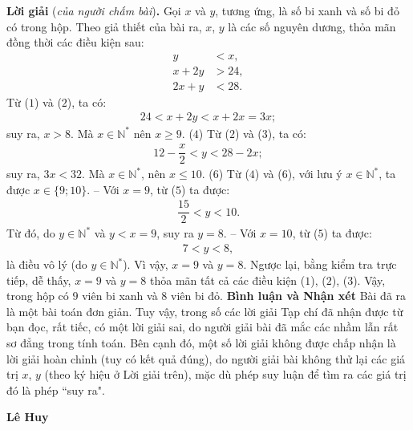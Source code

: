 \begin{multicols}{2}
	\vskip 0.05cm
	\textbf{\color{thachthuctoanhoc}Lời giải} (\textit{của người chấm bài})\textbf{\color{thachthuctoanhoc}.}
	\vskip 0.05cm
	Gọi $x$ và $y$, tương ứng, là số bi xanh và số bi đỏ có trong hộp.
	\vskip 0.05cm
	Theo giả thiết của bài ra, $x$, $y$ là các số nguyên dương, thỏa mãn đồng thời các điều kiện sau:
	\begin{align*}
		y &< x, \tag{$1$}\\
		x + 2y &> 24, \tag{$2$}\\
		2x + y &< 28. \tag{$3$}  
	\end{align*}
	Từ ($1$) và ($2$), ta có:
	\begin{align*}
		24 < x + 2y < x + 2x = 3x;
	\end{align*}
	suy ra, $x > 8$. Mà $x \in \mathbb{N^*}$  nên $x \ge  9$. \hfill ($4$)
	\vskip 0.05cm
	Từ ($2$) và ($3$), ta có:
	\begin{align*}
		12 - \dfrac{x}{2} < y < 28-2x; \tag{$5$}
	\end{align*}
	suy ra, $3x < 32$. Mà $x \in \mathbb{N^*}$, nên $x \le 10$. \hfill ($6$)
	\vskip 0.05cm
	Từ ($4$) và ($6$), với lưu ý $x \in \mathbb{N^*}$,  ta được \linebreak $x \in \{9; 10\}$.
	\vskip 0.05cm
	-- Với $x = 9$, từ ($5$) ta được:
	\begin{align*}
		\dfrac{15}{2} < y < 10.
	\end{align*}
	Từ đó, do $y \in \mathbb{N^*}$ và $y < x = 9$, suy ra $y = 8$.
	\vskip 0.05cm
	-- Với $x = 10$, từ ($5$) ta được:
	\begin{align*}
		7 < y < 8,
	\end{align*}
	là điều vô lý (do $y \in \mathbb{N^*}$).
	\vskip 0.05cm
	Vì vậy, $x = 9$ và $y = 8$.
	\vskip 0.05cm
	Ngược lại, bằng kiểm tra trực tiếp, dễ thấy, $x = 9$ và $y = 8$ thỏa mãn tất cả các điều kiện ($1$), ($2$), ($3$).
	\vskip 0.05cm
	Vậy, trong hộp có $9$ viên bi xanh và $8$ viên bi đỏ.
	\vskip 0.05cm
	\textbf{\color{thachthuctoanhoc}Bình luận và Nhận xét}
	\vskip 0.05cm	
	Bài đã ra là một bài toán đơn giản. Tuy vậy, trong số các lời giải Tạp chí đã nhận được từ bạn đọc, rất tiếc, có một lời giải sai, do người giải bài đã mắc các nhầm lẫn rất sơ đẳng trong tính toán. Bên cạnh đó, một số lời giải không được chấp nhận là lời giải hoàn chỉnh (tuy có kết quả đúng), do người giải bài không thử lại các giá trị $x$, $y$ (theo ký hiệu ở Lời giải trên), mặc dù phép suy luận để tìm ra các giá trị đó là phép ``suy ra".
	\begin{flushright}
		\textbf{\color{thachthuctoanhoc}Lê Huy}
	\end{flushright}

\end{multicols}
